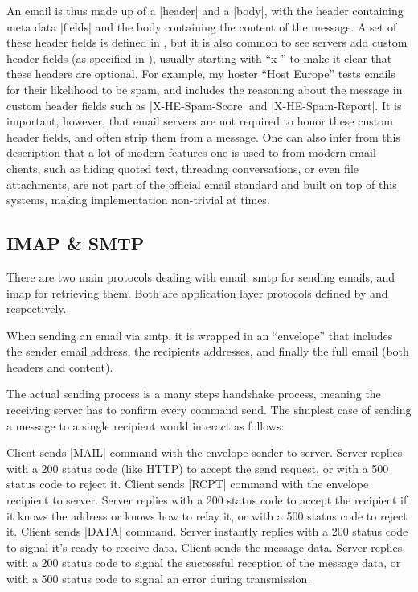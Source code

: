 An email is thus made up of a |header| and a |body|, with the header containing meta data |fields| and the body containing the content of the message. A set of these header fields is defined in \citep{email}, but it is also common to see servers add custom header fields (as specified in \citep[3.6.8]{email}), usually starting with ``x-'' to make it clear that these headers are optional. For example, my hoster ``Host Europe'' tests emails for their likelihood to be \gls{spam}, and includes the reasoning about the message in custom header fields such as |X-HE-Spam-Score| and |X-HE-Spam-Report|. It is important, however, that email servers are not required to honor these custom header fields, and often strip them from a message. One can also infer from this description that a lot of modern features one is used to from modern email clients, such as hiding quoted text, threading conversations, or even file attachments, are not part of the official email standard and built on top of this systems, making implementation non-trivial at times.

\subsection{IMAP \& SMTP}

There are two main protocols dealing with email: \gls{smtp} for sending emails, and \gls{imap} for retrieving them. Both are application layer protocols defined by \citet{smtp} and \citet{imap} respectively.

When sending an email via \gls{smtp}, it is wrapped in an ``envelope'' that includes the sender email address, the recipients addresses, and finally the full email (both headers and content).

The actual sending process is a many steps handshake process, meaning the receiving server has to confirm every command send. The simplest case of sending a message to a single recipient would interact as follows:

Client sends |MAIL| command with the envelope sender to server.
Server replies with a 200 status code (like HTTP) to accept the send request, or with a 500 status code to reject it.
Client sends |RCPT| command with the envelope recipient to server.
Server replies with a 200 status code to accept the recipient if it knows the address or knows how to relay it, or with a 500 status code to reject it.
Client sends |DATA| command.
Server instantly replies with a 200 status code to signal it's ready to receive data.
Client sends the message data.
Server replies with a 200 status code to signal the successful reception of the message data, or with a 500 status code to signal an error during transmission.

